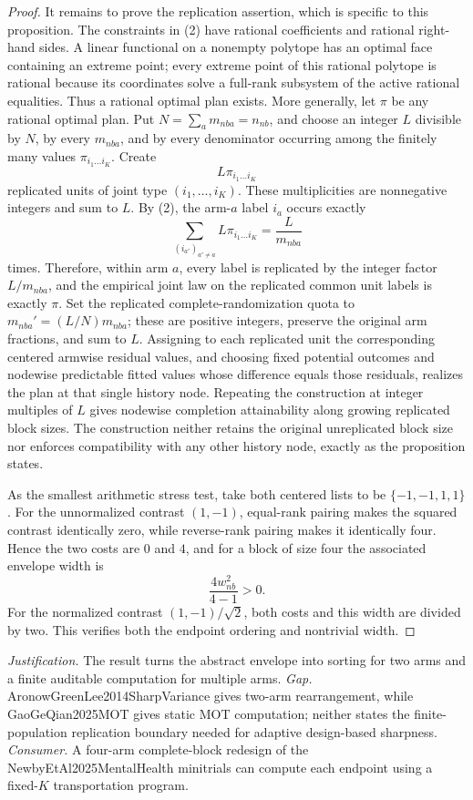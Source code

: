 \documentclass{article}
\begin{document}
\begin{proof}
It remains to prove the replication assertion, which is specific to this proposition. The constraints in (2) have rational coefficients and rational right-hand sides. A linear functional on a nonempty polytope has an optimal face containing an extreme point; every extreme point of this rational polytope is rational because its coordinates solve a full-rank subsystem of the active rational equalities. Thus a rational optimal plan exists. More generally, let \(\pi\) be any rational optimal plan. Put \(N=\sum_am_{nba}=n_{nb}\), and choose an integer \(L\) divisible by \(N\), by every \(m_{nba}\), and by every denominator occurring among the finitely many values \(\pi_{i_1\ldots i_K}\). Create
\[
L\pi_{i_1\ldots i_K}
\]
replicated units of joint type \((i_1,\ldots,i_K)\). These multiplicities are nonnegative integers and sum to \(L\). By (2), the arm-\(a\) label \(i_a\) occurs exactly
\[
\sum_{(i_{a'})_{a'\ne a}}L\pi_{i_1\ldots i_K}
=\frac{L}{m_{nba}}
\tag{3}
\]
times. Therefore, within arm \(a\), every label is replicated by the integer factor \(L/m_{nba}\), and the empirical joint law on the replicated common unit labels is exactly \(\pi\). Set the replicated complete-randomization quota to \(m_{nba}'=(L/N)m_{nba}\); these are positive integers, preserve the original arm fractions, and sum to \(L\). Assigning to each replicated unit the corresponding centered armwise residual values, and choosing fixed potential outcomes and nodewise predictable fitted values whose difference equals those residuals, realizes the plan at that single history node. Repeating the construction at integer multiples of \(L\) gives nodewise completion attainability along growing replicated block sizes. The construction neither retains the original unreplicated block size nor enforces compatibility with any other history node, exactly as the proposition states.

As the smallest arithmetic stress test, take both centered lists to be \(\{-1,-1,1,1\}\). For the unnormalized contrast \((1,-1)\), equal-rank pairing makes the squared contrast identically zero, while reverse-rank pairing makes it identically four. Hence the two costs are \(0\) and \(4\), and for a block of size four the associated envelope width is
\[
\frac{4w_{nb}^2}{4-1}>0.
\]
For the normalized contrast \((1,-1)/\sqrt2\), both costs and this width are divided by two. This verifies both the endpoint ordering and nontrivial width.
\end{proof}
\par\smallskip\noindent \textit{Justification.} The result turns the abstract envelope into sorting for two arms and a finite auditable computation for multiple arms. \textit{Gap.} AronowGreenLee2014SharpVariance gives two-arm rearrangement, while GaoGeQian2025MOT gives static MOT computation; neither states the finite-population replication boundary needed for adaptive design-based sharpness. \textit{Consumer.} A four-arm complete-block redesign of the NewbyEtAl2025MentalHealth minitrials can compute each endpoint using a fixed-\(K\) transportation program.
\end{document}
